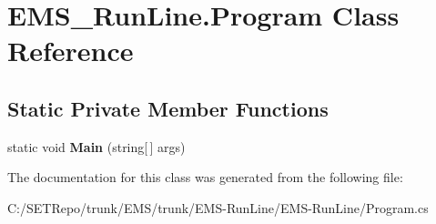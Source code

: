 \hypertarget{class_e_m_s___run_line_1_1_program}{}\section{E\+M\+S\+\_\+\+Run\+Line.\+Program Class Reference}
\label{class_e_m_s___run_line_1_1_program}
\subsection*{Static Private Member Functions}
\begin{DoxyCompactItemize}
\item 
\hypertarget{class_e_m_s___run_line_1_1_program_a9468a48e40f12fcca1ab0b4e02dbf978}{}static void {\bfseries Main} (string\mbox{[}$\,$\mbox{]} args)\label{class_e_m_s___run_line_1_1_program_a9468a48e40f12fcca1ab0b4e02dbf978}

\end{DoxyCompactItemize}


The documentation for this class was generated from the following file\+:\begin{DoxyCompactItemize}
\item 
C\+:/\+S\+E\+T\+Repo/trunk/\+E\+M\+S/trunk/\+E\+M\+S-\/\+Run\+Line/\+E\+M\+S-\/\+Run\+Line/Program.\+cs\end{DoxyCompactItemize}
